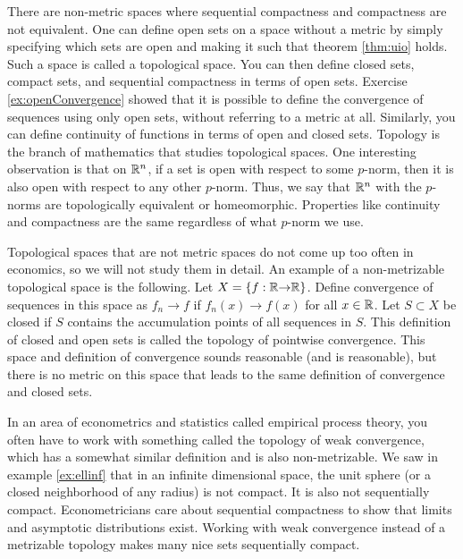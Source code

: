 \begin{remark}
  There are non-metric spaces where sequential compactness and
  compactness are not equivalent. One can define open sets on a space
  without a metric by simply specifying which sets are open and making
  it such that theorem \ref{thm:uio} holds. Such a space is called a
  topological space. You can then define closed sets, compact sets,
  and sequential compactness in terms of open sets.  Exercise
  \ref{ex:openConvergence} showed that it is possible to define the
  convergence of sequences using only open sets, without referring to
  a metric at all. Similarly, you can define continuity of functions
  in terms of open and closed sets. Topology is the branch of
  mathematics that studies topological spaces. One interesting
  observation is that on $\mathbb{R}^n$, if a set is open with respect to some
  $p$-norm, then it is also open with respect to any other
  $p$-norm. Thus, we say that $\mathbb{R}^n$ with the $p$-norms are
  topologically equivalent or homeomorphic. Properties like continuity
  and compactness are the same regardless of what $p$-norm we use.
  
  Topological spaces that are not metric spaces do not come up too
  often in economics, so we will not study them in detail. An example
  of a non-metrizable topological space is the following. Let
  $X = \{f: \mathbb{R} {\rightarrow} \mathbb{R}\}$. Define convergence of sequences in this
  space as $f_n \to f$ if $f_n(x) \to f(x)$ for all $x \in \mathbb{R}$. Let
  $S \subset X$ be closed if $S$ contains the accumulation points of
  all sequences in $S$. This definition of closed and open sets is
  called the topology of pointwise convergence. This space and
  definition of convergence sounds reasonable (and is reasonable), but
  there is no metric on this space that leads to the same definition
  of convergence and closed sets. 

  In an area of econometrics and statistics called empirical process
  theory, you often have to work with something called the topology of
  weak convergence, which has a somewhat similar definition and is
  also non-metrizable. We saw in example \ref{ex:ellinf} that in an
  infinite dimensional space, the unit sphere (or a closed
  neighborhood of any radius) is not compact. It is also not
  sequentially compact. Econometricians care about sequential
  compactness to show that limits and asymptotic distributions
  exist. Working with weak convergence instead of a metrizable
  topology makes many nice sets sequentially compact.
\end{remark}

